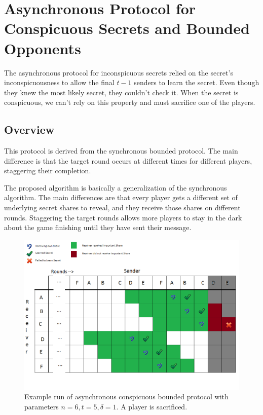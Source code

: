 \documentclass{dalcsthesis}
\begin{document}
\section{Asynchronous Protocol for Conspicuous Secrets and Bounded Opponents}

The asynchronous protocol for inconspicuous secrets relied on the secret's inconspicuousness to allow the final $t-1$ senders to learn the secret. Even though they knew the most likely secret, they couldn't check it. When the secret is conspicuous, we can't rely on this property and must sacrifice one of the players.

\subsection{Overview}

This protocol is derived from the synchronous bounded protocol. The main difference is that the target round occurs at different times for different players, staggering their completion.
 
The proposed algorithm is basically a generalization of the synchronous algorithm. The main differences are that every player gets a different set of underlying secret shares to reveal, and they receive those shares on different rounds. Staggering the target rounds allows more players to stay in the dark about the game finishing until they have sent their message.

\begin{figure}
\includegraphics[width=\textwidth]{../../Graphics/AsyncVerifiedSecret_n6t5d1.png}
\caption{Example run of asynchronous conspicuous bounded protocol with parameters $n=6, t=5, \delta=1$. A player is sacrificed.}
\label{AsyncExample1}
\end{figure}
\end{document}
